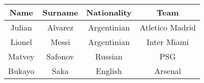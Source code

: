 \documentclass{article}
\begin{document}
\begin{table}[h]
\centering
\begin{tabular}{|c | c | c | c|}
\hline
Name & Surname & Nationality & Team \\
\hline
Julian & Alvarez & Argentinian & Atletico Madrid \\
Lionel & Messi & Argentinian & Inter Miami \\
Matvey & Safonov & Russian & PSG \\
Bukayo & Saka & English & Arsenal \\
\hline
\end{tabular}
\end{table}
\end{document}
